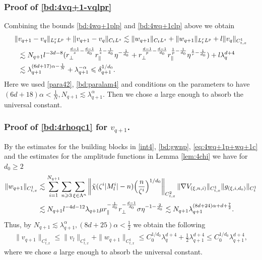 \documentclass[10pt,a4paper]{amsart}
\numberwithin{equation}{section}
\def\({{\Big(}}
\def\){{\Big)}}
\newcommand{\norm}[1]{\left\|#1\right\|}
\def\geq{\geqslant}
\def\leq{\leqslant}
\def\({{\Big(}}
\def\){{\Big)}}
\def\geq{\geqslant}
\def\leq{\leqslant}
\begin{document}
\subsubsection{Proof of  \eqref{bd:4vq+1-vqlpr}}

Combining  the bounds \eqref{bd:4wq+1plp} and \eqref{bd:4wq+1clp} above we obtain 
\begin{align}
\|&v_{q+1}-v_q\|_{L^{r}_tL^{p}}+\|v_{q+1}-v_q\|_{C_tL^{s}}\lesssim  \|w_{q+1}\|_{C_tL^{s}}+  \|w_{q+1}\|_{L^{r}_tL^{p}}+l\|v_q\|_{C_{t,x}^1}\notag \\
&\lesssim  N_{q+1}l^{-3d-8}( r_\perp^{\frac{d-1}s-\frac{d-1}{d_0}} r_\parallel^{\frac1s-\frac{1}{d_0}}\eta^{-\frac1{d_0}}+r_\perp^{\frac{d-1}{p}-\frac{d-1}{d_0}} r_\parallel^{\frac{1}{p}-\frac{1}{d_0}}\eta^{\frac1r-\frac1{d_0}})+l \lambda_q^{d+4}\notag\\ 
&\lesssim \lambda_{q+1}^{(6d+17)\alpha-\frac1N}+\lambda_{q+1}^{-\alpha}
\leq\delta_{q+1}^{1/d_0}.\label{bd:4wq+1lpr}
\end{align}
  Here we used \eqref{para42}, \eqref{bd:paralam4} and  conditions on the parameters to have 
${(6d+18)\alpha<\frac{1}{N}},N_{q+1}\lesssim\lambda_{q+1}^{\alpha}$. Then we chose $a$ large enough to absorb the universal constant. 


\subsubsection{Proof of  \eqref{bd:4rhoqc1} for $v_{q+1}$.}
 By the estimates for the building blocks in \eqref{int4}, \eqref{bd:gwnp},  \eqref{eq:4wq+1p+wq+1c} and the estimates for the amplitude functions in Lemma \ref{lem:4chi} we have for $d_0\geq2$
\begin{align}
\|w_{q+1}\|_{C_{t,x}^1}&\lesssim\sum_{i=1}^{N_{q+1}}\sum_{n\geq3}\sum_{\xi\in\Lambda^{n}}\norm{\tilde{\chi}(\zeta^{i}|M^{i}_l|-n)\(\frac{n}{\zeta^{i}}\)^{1/d_0}}_{C_{t,x}^{2}}\|\nabla V_{(\xi,n,i)}\|_{C_{t,x}^1}\|g_{(\xi,i,d_0)}\|_{C_t^1}\notag\\
&\lesssim N_{q+1}l^{-4d-12}\lambda_{q+1}\mu r_\parallel^{-\frac{1}{d_0}}r_\perp^{-\frac{d-1}{d_0}}\sigma\eta^{-1-\frac{2}{d_0}}\lesssim N_{q+1}\lambda_{q+1}^{(8d+24)\alpha+d+\frac72}.\notag
\end{align}
 Thus, by $N_{q+1}\lesssim\lambda_{q+1}^{\alpha},(8d+25)\alpha<\frac{1}{2}$ we obtain the following
 \begin{align*}
\|v_{q+1}\|_{C_{t,x}^1}\leq\|v_{l}\|_{C_{t,x}^1}+\|w_{q+1}\|_{C_{t,x}^1}\leq C_0^{1/d_0}\lambda_{q}^{d+4}+\frac12\lambda_{q+1}^{d+4}\leq C_0^{1/d_0}\lambda_{q+1}^{d+4},
 \end{align*} where we chose $a$ large enough to absorb the universal constant.
\end{document}
